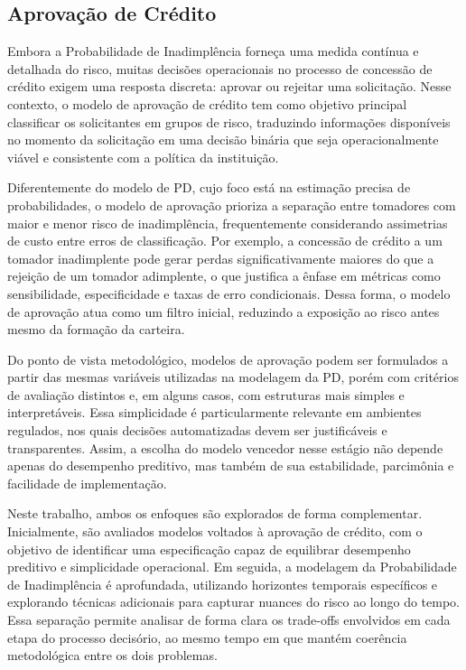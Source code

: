 \documentclass[
  brazilian,
  12pt,
  letterpaper,
  DIV=11,
  numbers=noendperiod]{scrartcl}
\begin{document}
\subsection{Aprovação de Crédito}\label{aprovauxe7uxe3o-de-cruxe9dito}

Embora a Probabilidade de Inadimplência forneça uma medida contínua e
detalhada do risco, muitas decisões operacionais no processo de
concessão de crédito exigem uma resposta discreta: aprovar ou rejeitar
uma solicitação. Nesse contexto, o modelo de aprovação de crédito tem
como objetivo principal classificar os solicitantes em grupos de risco,
traduzindo informações disponíveis no momento da solicitação em uma
decisão binária que seja operacionalmente viável e consistente com a
política da instituição.

Diferentemente do modelo de PD, cujo foco está na estimação precisa de
probabilidades, o modelo de aprovação prioriza a separação entre
tomadores com maior e menor risco de inadimplência, frequentemente
considerando assimetrias de custo entre erros de classificação. Por
exemplo, a concessão de crédito a um tomador inadimplente pode gerar
perdas significativamente maiores do que a rejeição de um tomador
adimplente, o que justifica a ênfase em métricas como sensibilidade,
especificidade e taxas de erro condicionais. Dessa forma, o modelo de
aprovação atua como um filtro inicial, reduzindo a exposição ao risco
antes mesmo da formação da carteira.

Do ponto de vista metodológico, modelos de aprovação podem ser
formulados a partir das mesmas variáveis utilizadas na modelagem da PD,
porém com critérios de avaliação distintos e, em alguns casos, com
estruturas mais simples e interpretáveis. Essa simplicidade é
particularmente relevante em ambientes regulados, nos quais decisões
automatizadas devem ser justificáveis e transparentes. Assim, a escolha
do modelo vencedor nesse estágio não depende apenas do desempenho
preditivo, mas também de sua estabilidade, parcimônia e facilidade de
implementação.

Neste trabalho, ambos os enfoques são explorados de forma complementar.
Inicialmente, são avaliados modelos voltados à aprovação de crédito, com
o objetivo de identificar uma especificação capaz de equilibrar
desempenho preditivo e simplicidade operacional. Em seguida, a modelagem
da Probabilidade de Inadimplência é aprofundada, utilizando horizontes
temporais específicos e explorando técnicas adicionais para capturar
nuances do risco ao longo do tempo. Essa separação permite analisar de
forma clara os trade-offs envolvidos em cada etapa do processo
decisório, ao mesmo tempo em que mantém coerência metodológica entre os
dois problemas.
\end{document}
